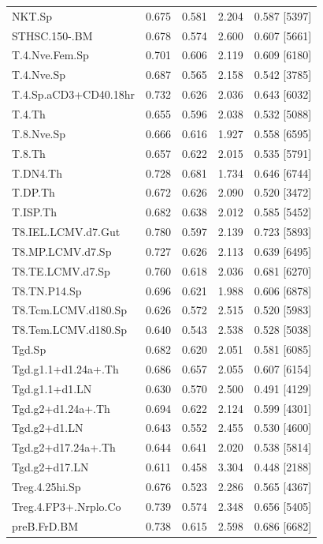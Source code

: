 \begin{longtable}[c]{lrrrr}
NKT.Sp & 0.675 & 0.581 & 2.204 & 0.587 [5397]  \\
STHSC.150-.BM & 0.678 & 0.574 & 2.600 & 0.607 [5661]  \\
T.4.Nve.Fem.Sp & 0.701 & 0.606 & 2.119 & 0.609 [6180]  \\
T.4.Nve.Sp & 0.687 & 0.565 & 2.158 & 0.542 [3785]  \\
T.4.Sp.aCD3+CD40.18hr & 0.732 & 0.626 & 2.036 & 0.643 [6032]  \\
T.4.Th & 0.655 & 0.596 & 2.038 & 0.532 [5088]  \\
T.8.Nve.Sp & 0.666 & 0.616 & 1.927 & 0.558 [6595]  \\
T.8.Th & 0.657 & 0.622 & 2.015 & 0.535 [5791]  \\
T.DN4.Th & 0.728 & 0.681 & 1.734 & 0.646 [6744]  \\
T.DP.Th & 0.672 & 0.626 & 2.090 & 0.520 [3472]  \\
T.ISP.Th & 0.682 & 0.638 & 2.012 & 0.585 [5452]  \\
T8.IEL.LCMV.d7.Gut & 0.780 & 0.597 & 2.139 & 0.723 [5893]  \\
T8.MP.LCMV.d7.Sp & 0.727 & 0.626 & 2.113 & 0.639 [6495]  \\
T8.TE.LCMV.d7.Sp & 0.760 & 0.618 & 2.036 & 0.681 [6270]  \\
T8.TN.P14.Sp & 0.696 & 0.621 & 1.988 & 0.606 [6878]  \\
T8.Tcm.LCMV.d180.Sp & 0.626 & 0.572 & 2.515 & 0.520 [5983]  \\
T8.Tem.LCMV.d180.Sp & 0.640 & 0.543 & 2.538 & 0.528 [5038]  \\
Tgd.Sp & 0.682 & 0.620 & 2.051 & 0.581 [6085]  \\
Tgd.g1.1+d1.24a+.Th & 0.686 & 0.657 & 2.055 & 0.607 [6154]  \\
Tgd.g1.1+d1.LN & 0.630 & 0.570 & 2.500 & 0.491 [4129]  \\
Tgd.g2+d1.24a+.Th & 0.694 & 0.622 & 2.124 & 0.599 [4301]  \\
Tgd.g2+d1.LN & 0.643 & 0.552 & 2.455 & 0.530 [4600]  \\
Tgd.g2+d17.24a+.Th & 0.644 & 0.641 & 2.020 & 0.538 [5814]  \\
Tgd.g2+d17.LN & 0.611 & 0.458 & 3.304 & 0.448 [2188]  \\
Treg.4.25hi.Sp & 0.676 & 0.523 & 2.286 & 0.565 [4367]  \\
Treg.4.FP3+.Nrplo.Co & 0.739 & 0.574 & 2.348 & 0.656 [5405]  \\
preB.FrD.BM & 0.738 & 0.615 & 2.598 & 0.686 [6682]  \\

\end{longtable}
